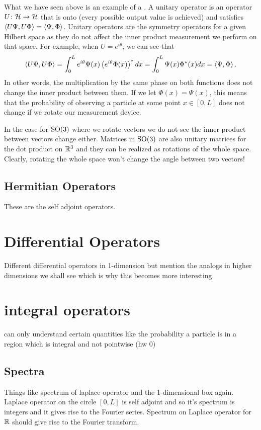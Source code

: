 What we have seen above is an example of a .  A unitary operator is an operator $U\colon \mathcal{H} \to \mathcal{H}$ that is onto (every possible output value is achieved) and satisfies $\left\langle U\Psi, U\Phi \right\rangle=\left\langle \Psi, \Phi \right\rangle$.  Unitary operators are the symmetry operators for a given Hilbert space as they do not affect the inner product measurement we perform on that space.  For example, when $U=e^{i\theta}$, we can see that
\[
\left\langle U\Psi, U\Phi \right\rangle = \int_0^L e^{i\theta}\Psi(x) \left(e^{i\theta} \Phi(x)\right)^*dx = \int_0^L \Psi(x)\Phi^*(x)dx = \left\langle \Psi, \Phi \right\rangle.
\]
In other words, the multiplication by the same phase on both functions does not change the inner product between them. If we let $\Phi(x)=\Psi(x)$, this means that the probability of observing a particle at some point $x\in [0,L]$ does not change if we rotate our measurement device.  

In the case for $\mathrm{SO}(3)$ where we rotate vectors we do not see the inner product between vectors change either.  Matrices in $\mathrm{SO}(3)$ are also unitary matrices for the dot product on $\mathbb{R}^3$ and they can be realized as rotations of the whole space.  Clearly, rotating the whole space won't change the angle between two vectors!

\subsection{Hermitian Operators}
These are the self adjoint operators.

\section{Differential Operators}
Different differential operators in 1-dimension but mention the analogs in higher dimensions we shall see which is why this becomes more interesting. 

\section{integral operators}

can only understand certain quantities like the probability a particle is in a region which is integral and not pointwise (hw 0)

\subsection{Spectra}

Things like spectrum of laplace operator and the 1-dimensional box again. Laplace operator on the circle $[0,L]$ is self adjoint and so it's spectrum is integers and it gives rise to the Fourier series.  Spectrum on Laplace operator for $\mathbb{R}$ should give rise to the Fourier transform.  